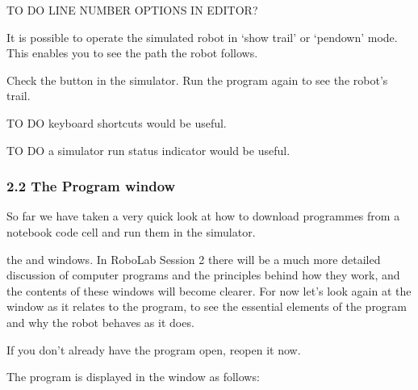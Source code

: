 \documentclass[letterpaper,10pt,english]{sphinxmanual}
\begin{document}
TO DO \sphinxhyphen{} LINE NUMBER OPTIONS IN EDITOR?

It is possible to operate the simulated robot in ‘show trail’ or ‘pen\sphinxhyphen{}down’ mode. This enables you to see the path the robot follows.

Check the  button in the simulator. Run the program again to see the robot’s trail.

TO DO \sphinxhyphen{} keyboard shortcuts would be useful.

TO DO \sphinxhyphen{} a simulator run status indicator would be useful.


\subsubsection{2.2 The Program window}
\label{\detokenize{content/00_SOFTWARE_GUIDE/Section_00_02-nb3devsim:2.2-The-Program-window}}
So far we have taken a very quick look at how to download programmes from a notebook code cell and run them in the simulator.

the  and  windows. In RoboLab Session 2 there will be a much more detailed discussion of computer programs and the principles behind how they work, and the contents of these windows will become clearer. For now let’s look again at the  window as it relates to the  program, to see the essential elements of the program and why the robot behaves as it does.

If you don’t already have the  program open, reopen it now.

The  program is displayed in the  window as follows:

\begin{sphinxVerbatim}[commandchars=\\\{\}]


     

   

  
\end{sphinxVerbatim}
\end{document}
